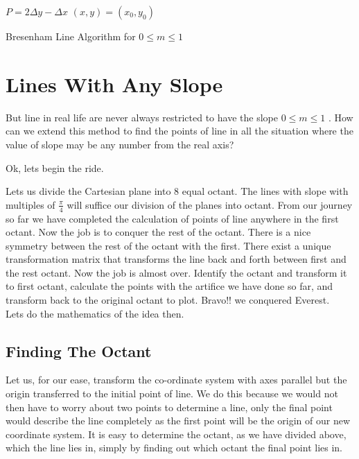 \documentclass[a4paper,12pt,oneside]{book}
\begin{document}
\begin{algorithm}[H]
		
	\SetAlgoLined
	$P=2\Delta y-\Delta x$\;
	$(x,y)=(x_0,y_0)$\;
	\caption{Bresenham Line Algorithm for $0 \leq m  \leq 1$}
\end{algorithm}


\section{Lines With Any Slope}

But line in real life are never always restricted to have the slope  $0\leq m\leq 1$  . How can we extend this method to find the points of line in all the situation where the value of slope may be any number from the real axis?

Ok, lets begin the ride.

Lets us divide the Cartesian plane into 8 equal octant. The lines with slope with multiples of $\frac{\pi}{4}$ will suffice our division of the planes into octant. From our journey so far we have completed the calculation of points of line anywhere in the first octant. Now the job is to conquer the rest of the octant. There is a nice symmetry between the rest of the octant with the first. There exist a unique transformation matrix that transforms the line back and forth between first and the rest octant. Now the job is almost over. 
Identify the octant and transform it to first octant, calculate the points with the artifice we have done so far, and transform back to the original octant to plot.
Bravo!! we conquered Everest.\\
Lets do the mathematics of the idea then.
\subsection{Finding The Octant}
Let us, for our ease, transform the co-ordinate system with axes parallel but the origin transferred to the initial point of line. We do this because we would not then have to worry about two points to determine a line, only the final point would describe the line completely as the first point will be the origin of our new coordinate system. 
It is easy to determine the octant, as we have divided above, which the line lies in, simply by finding out which octant the final point lies in. 
\end{document}

